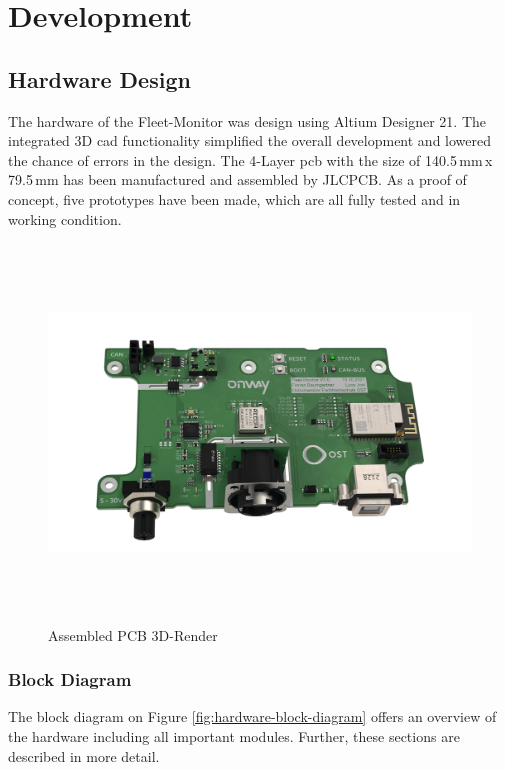 \chapter{Development}

\section{Hardware Design}
The hardware of the Fleet-Monitor was design using Altium Designer 21. The integrated 3D \acrshort{cad} functionality simplified the overall development and lowered the chance of errors in the design. The 4-Layer \acrfull{pcb} with the size of 140.5\,mm\,x\,79.5\,mm has been manufactured and assembled by JLCPCB.\newline
As a proof of concept, five prototypes have been made, which are all fully tested and in working condition.

\begin{figure}[h!]
	\hfuzz=57.0pt
	\hspace{-1.4cm}
	\includegraphics[height=10.0cm]{images/fleet-monitor-rendering-pcb}
	\caption{Assembled PCB 3D-Render}
	\label{fig:fleet-monitor-rendering-pcb}
\end{figure}
\newpage

\subsection{Block Diagram}
The block diagram on Figure \ref{fig:hardware-block-diagram} offers an overview of the hardware including all important modules. Further, these sections are described in more detail.

